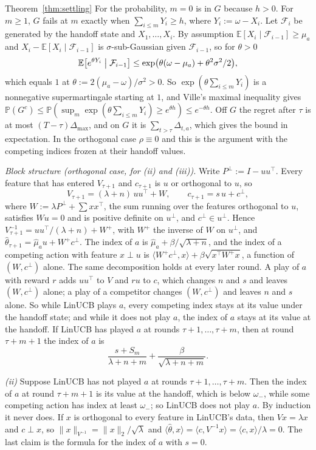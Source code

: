 \documentclass[anon]{alt2027} %
\newcommand{\Prb}{\mathbb{P}}
\newcommand{\E}{\mathbb{E}}
\begin{document}
\begin{proofof}{Theorem~\ref{thm:settling}}
For the probability, $m=0$ is in $G$ because $h>0$. For $m\ge1$, $G$ fails at
$m$ exactly when $\sum_{i\le m}Y_i\ge h$, where $Y_i:=\omega-X_i$. Let
$\mathcal F_i$ be generated by the handoff state and $X_1,\dots,X_i$. By
assumption $\E[X_i\mid\mathcal F_{i-1}]\ge\mu_a$ and $X_i-\E[X_i\mid\mathcal F_{i-1}]$
is $\sigma$-sub-Gaussian given $\mathcal F_{i-1}$, so for $\theta>0$
\[
\E\bigl[e^{\theta Y_i}\bigm|\mathcal F_{i-1}\bigr]
\le\exp\bigl(\theta(\omega-\mu_a)+\theta^2\sigma^2/2\bigr),
\]
which equals $1$ at $\theta:=2(\mu_a-\omega)/\sigma^2>0$. So
$\exp(\theta\sum_{i\le m}Y_i)$ is a nonnegative supermartingale starting at
$1$, and Ville's maximal inequality gives
$\Prb(G^c)\le\Prb(\sup_m\exp(\theta\sum_{i\le m}Y_i)\ge e^{\theta h})\le e^{-\theta h}$.
Off $G$ the regret after $\tau$ is at most $(T-\tau)\Delta_{\max}$, and on $G$ it
is $\sum_{t>\tau}\Delta_{t,a}$, which gives the bound in expectation. In the
orthogonal case $\rho\equiv0$ and this is the argument with the competing
indices frozen at their handoff values.

\emph{Block structure (orthogonal case, for (ii) and (iii)).} Write
$P^\perp:=I-uu^\top$. Every feature that has entered $V_{\tau+1}$ and
$c_{\tau+1}$ is $u$ or orthogonal to $u$, so
\[
V_{\tau+1}=(\lambda+n)\,uu^\top+W,\qquad c_{\tau+1}=s\,u+c^\perp,
\]
where $W:=\lambda P^\perp+\sum xx^\top$, the sum running over the features
orthogonal to $u$, satisfies $Wu=0$ and is positive definite on $u^\perp$, and
$c^\perp\in u^\perp$. Hence $V_{\tau+1}^{-1}=uu^\top/(\lambda+n)+W^+$, with
$W^+$ the inverse of $W$ on $u^\perp$, and
$\widehat\theta_{\tau+1}=\widehat\mu_a u+W^+c^\perp$. The index of $a$ is
$\widehat\mu_a+\beta/\sqrt{\lambda+n}$, and the index of a competing action
with feature $x\perp u$ is $\langle W^+c^\perp,x\rangle+\beta\sqrt{x^\top W^+x}$,
a function of $(W,c^\perp)$ alone. The same decomposition holds at every later
round. A play of $a$ with reward $r$ adds $uu^\top$ to $V$ and $ru$ to $c$,
which changes $n$ and $s$ and leaves $(W,c^\perp)$ alone; a play of a
competitor changes $(W,c^\perp)$ and leaves $n$ and $s$ alone. So while LinUCB
plays $a$, every competing index stays at its value under the handoff state;
and while it does not play $a$, the index of $a$ stays at its value at the
handoff. If LinUCB has played $a$ at rounds $\tau+1,\dots,\tau+m$, then at
round $\tau+m+1$ the index of $a$ is
\[
\frac{s+S_m}{\lambda+n+m}+\frac{\beta}{\sqrt{\lambda+n+m}}.
\]

\emph{(ii)} Suppose LinUCB has not played $a$ at rounds $\tau+1,\dots,\tau+m$.
Then the index of $a$ at round $\tau+m+1$ is its value at the handoff, which
is below $\omega_-$, while some competing action has index at least
$\omega_-$; so LinUCB does not play $a$. By induction it never does. If $x$ is
orthogonal to every feature in LinUCB's data, then $Vx=\lambda x$ and $c\perp x$,
so $\|x\|_{V^{-1}}=\|x\|_2/\sqrt\lambda$ and
$\langle\widehat\theta,x\rangle=\langle c,V^{-1}x\rangle=\langle c,x\rangle/\lambda=0$.
The last claim is the formula for the index of $a$ with $s=0$.


\end{proofof}
\end{document}

